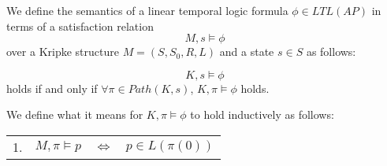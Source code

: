 \begin{mydef}
We define the semantics of a linear temporal logic formula $\phi \in LTL(AP)$ in terms of a satisfaction relation $$M,s \models \phi$$ over a Kripke structure $M = (S, S_0,R,L)$ and a state $s \in S$ as follows:

$$K,s \models \phi$$ holds if and only if $\forall \pi \in Path(K, s)$, $K,\pi \models \phi$ holds.

We define what it means for $K, \pi \models \phi$ to hold inductively as follows:

\begin{comment}

\begin{itemize} 
\item $K,\pi \models \phi$ always holds.

\item For all propositional formulae $p \in AP$ the following always holds:
     $$K,\pi \models p \leftrightarrow p \in L(\pi(0))$$

\item For all LTL formulas $\mathbf{X} \phi \in LTL(K)$ the following always holds:
$$ K, \pi \models \mathbf{X} \phi \leftrightarrow K, succ;\pi \models \phi $$

where $succ$ is a successor function $succ: N \_ \to N$ such that $succ;\pi(n) = \pi(succ(n)) = \pi(n + 1)$.

\item For all LTL formulas $\phi \mathbf{U} \psi \in LTL(K)$ the following always holds:
$$K, \pi \models_{LTL} \phi \mathbf{U} \psi \leftrightarrow$$
$$\exists n \in N.$$
$$(K,succ^n; \pi \models_{LTL} \psi) \wedge (\forall m \in N. m < n \to K, succ^m;\i \models_{LTL} \phi)$$

\item For all LTL formulas $\neg \phi \in LTL(AP)$ the following always holds:
$$K,\pi \models_{LTL} \neg \phi \leftrightarrow K,\pi \not\models \phi $$

\item For all LTL formulas $\phi \vee \psi \in LTL(AP)$ the following always holds
$$K,\pi \models_{LTL} \phi \vee \psi \leftrightarrow K,\pi \models_{LTL} \phi \ \mathrm{or} \ K,\pi \models_{LTL} \psi $$

\end{itemize}

\end{comment}

\begin{center}
\begin{tabular}{l | l  c  l}
1. & $M, \pi \models p$  & $\Leftrightarrow$ & $p \in L(\pi(0))$ \\


\end{tabular}
\end{center}
\end{mydef}
